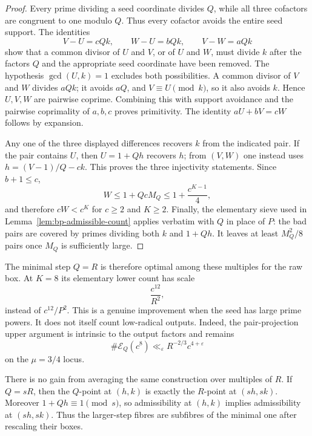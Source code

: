 \begin{proof}
Every prime dividing a seed coordinate divides $Q$, while all three
cofactors are congruent to one modulo $Q$.  Thus every cofactor avoids the
entire seed support.  The identities
\[
 V-U=cQk,\qquad W-U=bQk,\qquad V-W=aQk
\]
show that a common divisor of $U$ and $V$, or of $U$ and $W$, must divide
$k$ after the factors $Q$ and the appropriate seed coordinate have been
removed.  The hypothesis $\gcd(U,k)=1$ excludes both possibilities.  A
common divisor of $V$ and $W$ divides $aQk$; it avoids $aQ$, and
$V\equiv U\pmod{k}$, so it also avoids $k$.  Hence $U,V,W$ are pairwise
coprime.  Combining this with support avoidance and the pairwise
coprimality of $a,b,c$ proves primitivity.  The identity
$aU+bV=cW$ follows by expansion.

Any one of the three displayed differences recovers $k$ from the indicated
pair.  If the pair contains $U$, then $U=1+Qh$ recovers $h$; from $(V,W)$ one
instead uses $h=(V-1)/Q-ck$.  This proves the three injectivity statements.
Since $b+1\leq c$,
\[
 W\leq1+QcM_Q\leq1+\frac{c^{K-1}}4,
\]
and therefore $cW<c^K$ for $c\geq2$ and $K\geq2$.  Finally, the elementary
sieve used in Lemma~\ref{lem:bp-admissible-count} applies verbatim with $Q$
in place of $P$: the bad pairs are covered by primes dividing both $k$ and
$1+Qh$.  It leaves at least $M_Q^2/8$ pairs once $M_Q$ is sufficiently
large.
\end{proof}

The minimal step $Q=R$ is therefore optimal among these multiples for the
raw box.  At $K=8$ its elementary lower count has scale
\begin{equation}\label{eq:gpsp-raw-rad-step}
                    \frac{c^{12}}{R^2},
\end{equation}
instead of $c^{12}/P^2$.  This is a genuine improvement when the seed has
large prime powers.  It does not itself count low-radical outputs.  Indeed,
the pair-projection upper argument is intrinsic to the output factors and
remains
\begin{equation}\label{eq:gpsp-exception-upper}
 \#\mathcal E_Q(c^8)\ll_{\varepsilon}R^{-2/3}c^{4+\varepsilon}
\end{equation}
on the $\mu=3/4$ locus.

There is no gain from averaging the same construction over multiples of
$R$.  If $Q=sR$, then the $Q$-point at $(h,k)$ is exactly the $R$-point at
$(sh,sk)$.  Moreover $1+Qh\equiv1\pmod{s}$, so admissibility at $(h,k)$
implies admissibility at $(sh,sk)$.  Thus the larger-step fibres are
subfibres of the minimal one after rescaling their boxes.

